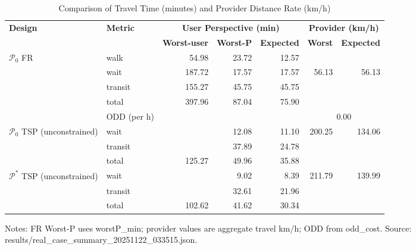 \begin{table}[t]
\centering
\caption{Comparison of Travel Time (minutes) and Provider Distance Rate (km/h)}
\begin{tabular}{l l r r r r r}
\toprule
\textbf{Design} & \textbf{Metric} & 
\multicolumn{3}{c}{\textbf{User Perspective (min)}} & 
\multicolumn{2}{c}{\textbf{Provider (km/h)}} \\
\cmidrule(lr){3-5}\cmidrule(lr){6-7}
& & \textbf{Worst-user} & \textbf{Worst-P} & \textbf{Expected} & \textbf{Worst} & \textbf{Expected} \\
\midrule
$\mathcal{P}_0$ FR & walk    & 54.98 & 23.72 & 12.57 &        &        \\
                   & wait    & 187.72 & 17.57 & 17.57 & 56.13  & 56.13  \\
                   & transit & 155.27 & 45.75 & 45.75 &        &        \\
                   & total   & 397.96 & 87.04 & 75.90 &       &        \\
                   & ODD (per h) &  &  &  & \multicolumn{2}{c}{0.00} \\
\midrule
$\mathcal{P}_0$ TSP (unconstrained) & wait    &  & 12.08 & 11.10 & 200.25 & 134.06 \\
                                    & transit &  & 37.89 & 24.78 &        &       \\
                                    & total   & 125.27 & 49.96 & 35.88 &        &       \\
\midrule
$\mathcal{P}^*$ TSP (unconstrained) & wait    &  & 9.02 & 8.39 & 211.79 & 139.99 \\
                                    & transit &  & 32.61 & 21.96 &        &       \\
                                    & total   & 102.62 & 41.62 & 30.34 &        &       \\
\bottomrule
\end{tabular}

\vspace{0.5ex}
\small
Notes: FR Worst-P uses worstP\_min; provider values are aggregate travel km/h; ODD from odd\_cost. Source: results/real_case_summary_20251122_033515.json.
\end{table}